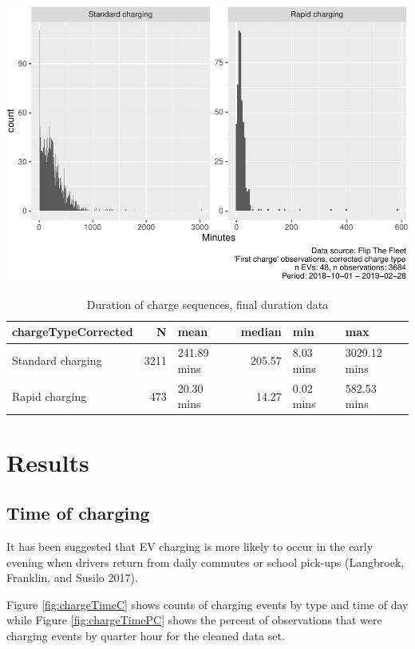 \documentclass[]{article}
\begin{document}
\includegraphics{EVBB_report_v1_files/figure-latex/longDuration-1.pdf}

\begin{table}[t]

\caption{\label{tab:longDuration}Duration of charge sequences, final duration data}
\centering
\begin{tabular}{l|r|l|r|l|l}
\hline
chargeTypeCorrected & N & mean & median & min & max\\
\hline
Standard charging & 3211 & 241.89 mins & 205.57 & 8.03 mins & 3029.12 mins\\
\hline
Rapid charging & 473 & 20.30 mins & 14.27 & 0.02 mins & 582.53 mins\\
\hline
\end{tabular}
\end{table}

\hypertarget{results}{%
\section{Results}\label{results}}

\hypertarget{time-of-charging}{%
\subsection{Time of charging}\label{time-of-charging}}

It has been suggested that EV charging is more likely to occur in the early evening when drivers return from daily commutes or school pick-ups (Langbroek, Franklin, and Susilo 2017).

Figure \ref{fig:chargeTimeC} shows counts of charging events by type and time of day while Figure \ref{fig:chargeTimePC} shows the percent of observations that were charging events by quarter hour for the cleaned data set.
\end{document}
